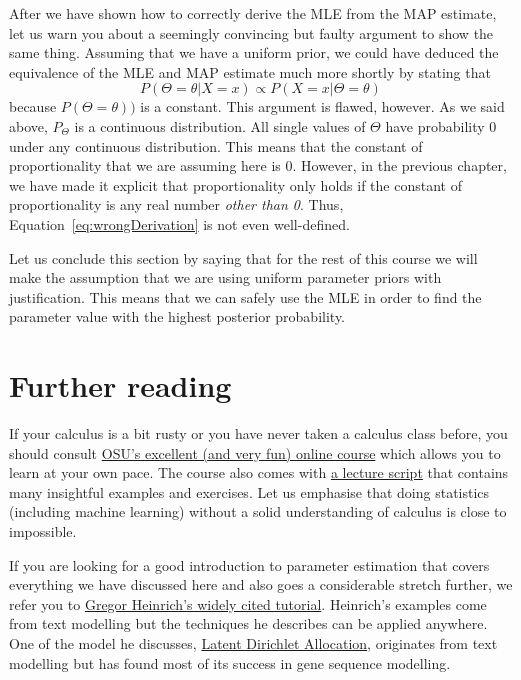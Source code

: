 After we have shown how to correctly derive the MLE from the MAP estimate, let us warn you about a seemingly convincing but faulty argument to show the same thing.
Assuming that we have a uniform prior, we could have deduced the equivalence of the MLE and MAP estimate much more shortly by stating that
\begin{equation}
P(\Theta = \theta| X=x) \propto P(X=x|\Theta=\theta) \label{eq:wrongDerivation}
\end{equation}
because $ P(\Theta = \theta)) $ is a constant. This argument is flawed, however. As we said above, $ P_{\Theta} $ is a continuous distribution. All single values of
$ \Theta $ have probability 0 under any continuous distribution. This means that the constant of proportionality that we are assuming here is 0. However, in the
previous chapter, we have made it explicit that proportionality only holds if the constant of proportionality is any real number \emph{other than 0}. Thus, 
Equation~\eqref{eq:wrongDerivation} is not even well-defined. 

Let us conclude this section by saying that for the rest of this course we will make the assumption that we are using uniform parameter priors with justification.
This means that we can safely use the MLE in order to find the parameter value with the highest posterior probability.


\section*{Further reading}
If your calculus is a bit rusty or you have never taken a calculus class before, you should consult 
\href{https://www.coursera.org/learn/calculus1}{OSU's excellent (and very fun) online course} which allows you to learn at your own pace. The course also comes with
\href{https://mooculus.osu.edu/handouts}{a lecture script} that contains many insightful examples and exercises. Let us emphasise that doing statistics (including
machine learning) without a solid understanding of calculus is close to impossible.

If you are looking for a good introduction to
parameter estimation that covers everything we have discussed here and also goes a considerable stretch further, we refer you to 
\href{http://www.arbylon.net/publications/text-est.pdf}{Gregor Heinrich's widely cited tutorial}. Heinrich's examples come from text modelling but the techniques he
describes can be applied anywhere. One of the model he discusses, \href{https://en.wikipedia.org/wiki/Latent_Dirichlet_allocation}{Latent Dirichlet Allocation}, originates
from text modelling but has found most of its success in gene sequence modelling. 


